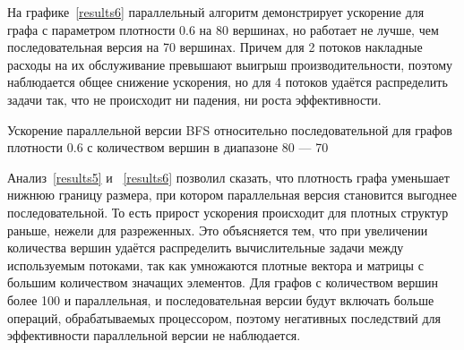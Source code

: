 На графике~\ref{results6} параллельный алгоритм демонстрирует ускорение для графа с параметром плотности 0.6 на 80 вершинах, но работает не лучше, чем последовательная версия на 70 вершинах. Причем для 2 потоков накладные расходы на их обслуживание превышают выигрыш производительности, поэтому наблюдается общее снижение ускорения, но для 4 потоков удаётся распределить задачи так, что не происходит ни падения, ни роста эффективности.

\begin{table}
  \centering

\caption{Ускорение параллельной версии BFS относительно последовательной для графов плотности 0.6 с количеством вершин в диапазоне 80 --- 70}
\label{results6}
\end{table}

Анализ~\ref{results5} и ~\ref{results6} позволил сказать, что плотность графа уменьшает нижнюю границу размера, при котором параллельная версия становится выгоднее последовательной. То есть прирост ускорения происходит для плотных структур раньше, нежели для разреженных.
Это объясняется тем, что при увеличении количества вершин удаётся распределить вычислительные задачи между используемым потоками, так как умножаются плотные вектора и матрицы с большим количеством значащих элементов. Для графов с количеством вершин более 100 и параллельная, и последовательная версии будут включать больше операций, обрабатываемых процессором, поэтому негативных последствий для эффективности параллельной версии не наблюдается.
